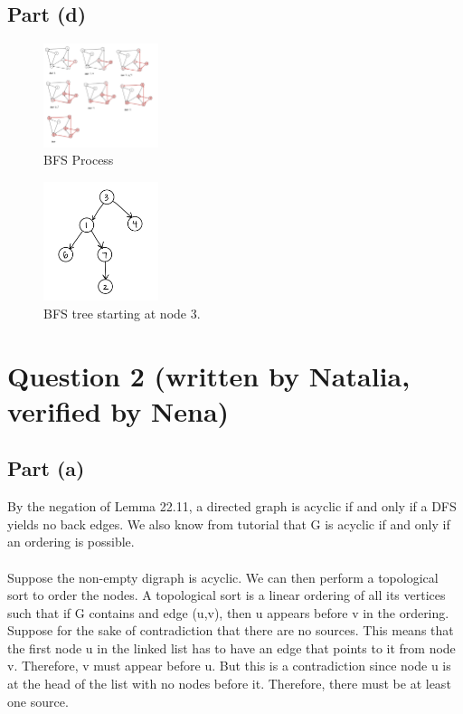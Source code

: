 \documentclass{article}
\begin{document}
\subsection*{Part (d)}
\begin{figure}[ht!]
        \centering
        \includegraphics[width=0.3\textwidth]{Q1d.1.JPG}
        \caption{BFS Process}
        \label{f:Q1d.1}
\end{figure}

\begin{figure}[ht!]
        \centering
        \includegraphics[width=0.3\textwidth]{Q1d.2.JPG}
        \caption{BFS tree starting at node 3.}
        \label{f:Q1d.2}
\end{figure}

\section*{Question 2 (written by Natalia, verified by Nena)}
\subsection*{Part (a)}
 By the negation of Lemma 22.11, a directed graph is acyclic if and only if a DFS yields no back edges. We also know from tutorial that G is acyclic if and only if an ordering is possible.\\
 \\
 Suppose the non-empty digraph is acyclic. We can then perform a topological sort to order the nodes. A topological sort is a linear ordering of all its vertices such that if G contains and edge (u,v), then u appears before v in the ordering. Suppose for the sake of contradiction that there are no sources. This means that the first node u in the linked list has to have an edge that points to it from node v. Therefore, v must appear before u. But this is a contradiction since node u is at the head of the list with no nodes before it. Therefore, there must be at least one source. 
\end{document}

